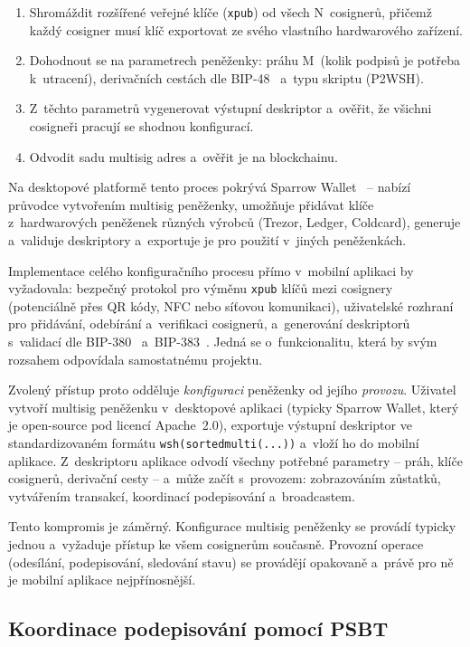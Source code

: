 \begin{enumerate}
  \item Shromáždit rozšířené veřejné klíče (\texttt{xpub}) od všech
    N~cosignerů, přičemž každý cosigner musí klíč exportovat ze svého
    vlastního hardwarového zařízení.
  \item Dohodnout se na parametrech peněženky: práhu M~(kolik podpisů
    je potřeba k~utracení), derivačních cestách dle BIP-48~\citep{BIP48}
    a~typu skriptu (P2WSH).
  \item Z~těchto parametrů vygenerovat výstupní deskriptor a~ověřit,
    že všichni cosigneři pracují se shodnou konfigurací.
  \item Odvodit sadu multisig adres a~ověřit je na blockchainu.
\end{enumerate}

Na desktopové platformě tento proces pokrývá Sparrow
Wallet~\citep{SparrowWallet} -- nabízí průvodce vytvořením multisig
peněženky, umožňuje přidávat klíče z~hardwarových peněženek různých
výrobců (Trezor, Ledger, Coldcard), generuje a~validuje deskriptory
a~exportuje je pro použití v~jiných peněženkách.

Implementace celého konfiguračního procesu přímo v~mobilní aplikaci
by vyžadovala: bezpečný protokol pro výměnu \texttt{xpub} klíčů mezi
cosignery (potenciálně přes QR kódy, NFC nebo síťovou komunikaci),
uživatelské rozhraní pro přidávání, odebírání a~verifikaci cosignerů,
a~generování deskriptorů s~validací dle BIP-380~\citep{BIP380}
a~BIP-383~\citep{BIP383}. Jedná se o~funkcionalitu, která by svým
rozsahem odpovídala samostatnému projektu.

Zvolený přístup proto odděluje \emph{konfiguraci} peněženky od
jejího \emph{provozu}. Uživatel vytvoří multisig peněženku
v~desktopové aplikaci (typicky Sparrow Wallet, který je open-source
pod licencí Apache~2.0), exportuje výstupní deskriptor ve
standardizovaném formátu \texttt{wsh(sortedmulti(...))} a~vloží
ho do mobilní aplikace. Z~deskriptoru aplikace odvodí všechny
potřebné parametry -- práh, klíče cosignerů, derivační cesty --
a~může začít s~provozem: zobrazováním zůstatků, vytvářením
transakcí, koordinací podepisování a~broadcastem.

Tento kompromis je záměrný. Konfigurace multisig peněženky se
provádí typicky jednou a~vyžaduje přístup ke všem cosignerům
současně. Provozní operace (odesílání, podepisování, sledování
stavu) se provádějí opakovaně a~právě pro ně je mobilní aplikace
nejpřínosnější.


\subsection{Koordinace podepisování pomocí PSBT}
\label{sec:analyza-psbt}

